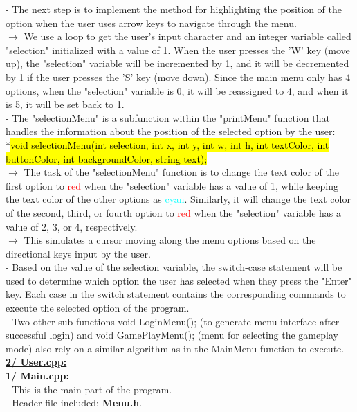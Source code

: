 \documentclass[12pt,a4paper]{report}
\begin{document}
- The next step is to implement the method for highlighting the position of the option when the user uses arrow keys to navigate through the menu.\\
\hspace{-0.6cm}$\rightarrow$ We use a loop to get the user's input character and an integer variable called "selection" initialized with a value of 1. When the user presses the 'W' key (move up), the "selection" variable will be incremented by 1, and it will be decremented by 1 if the user presses the 'S' key (move down). Since the main menu only has 4 options, when the "selection" variable is 0, it will be reassigned to 4, and when it is 5, it will be set back to 1.\\[0.2cm]
- The "selectionMenu" is a subfunction within the "printMenu" function that handles the information about the position of the selected option by the user:\\
*\hl{void selectionMenu(int selection, int x, int y, int w, int h, int textColor, int buttonColor, int backgroundColor, string text);}\\
 $\rightarrow$ The task of the "selectionMenu" function is to change the text color of the first option to \textcolor{red}{red} when the "selection" variable has a value of 1, while keeping the text color of the other options as \textcolor{cyan}{cyan}. Similarly, it will change the text color of the second, third, or fourth option to \textcolor{red}{red} when the "selection" variable has a value of 2, 3, or 4, respectively.\\
$\rightarrow$ This simulates a cursor moving along the menu options based on the directional keys input by the user.\\[0.2cm]
- Based on the value of the selection variable, the switch-case statement will be used to determine which option the user has selected when they press the "Enter" key. Each case in the switch statement contains the corresponding commands to execute the selected option of the program.\\
- Two other sub-functions void LoginMenu(); (to generate menu interface after successful login) and void GamePlayMenu(); (menu for selecting the gameplay mode) also rely on a similar algorithm as in the MainMenu function to execute.\\[0.4cm]
\textbf{\underline{2/ User.cpp:}}\\[0.2cm]
\textbf{1/ Main.cpp:}\\
- This is the main part of the program.\\
- Header file included: \textbf{Menu.h}.\\[0.4cm]
\end{document}
